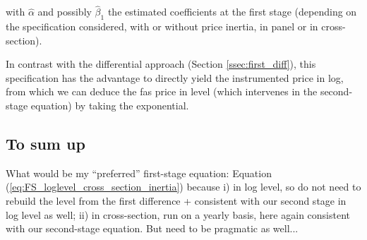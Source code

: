 \documentclass[11pt,twoside, authoryear]{elsarticle}
\begin{document}
\noindent with $ \widehat{ \alpha}$ and possibly $ \widehat{\beta}_1$ the estimated coefficients at the first stage (depending on the specification considered, with or without price inertia, in panel or in cross-section).

In contrast with the differential approach (Section \ref{ssec:first_diff}), this specification has the advantage to directly yield the instrumented price in log, from which we can deduce the fas price in level (which intervenes in the second-stage equation) by taking the exponential.

\subsection{To sum up}

What would be my ``preferred'' first-stage equation: Equation (\ref{eq:FS_loglevel_cross_section_inertia}) because i) in log level, so do not need to rebuild the level from the first difference + consistent with our second stage in log level as well; ii) in cross-section, run on a yearly basis, here again consistent with our second-stage equation. But need to be pragmatic as well... 
\end{document}
